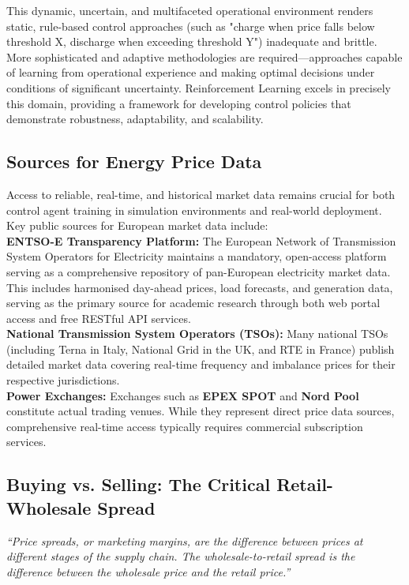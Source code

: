 \noindent
This dynamic, uncertain, and multifaceted operational environment renders static, rule-based control approaches (such as "charge when price falls below threshold X, discharge when exceeding threshold Y") inadequate and brittle. More sophisticated and adaptive methodologies are required—approaches capable of learning from operational experience and making optimal decisions under conditions of significant uncertainty. Reinforcement Learning excels in precisely this domain, providing a framework for developing control policies that demonstrate robustness, adaptability, and scalability.




\subsection{Sources for Energy Price Data}

Access to reliable, real-time, and historical market data remains crucial for both control agent training in simulation environments and real-world deployment. Key public sources for European market data include:
\\
\noindent
 \textbf{ENTSO-E Transparency Platform:} The European Network of Transmission System Operators for Electricity maintains a mandatory, open-access platform serving as a comprehensive repository of pan-European electricity market data. This includes harmonised day-ahead prices, load forecasts, and generation data, serving as the primary source for academic research through both web portal access and free RESTful API services.
    \\
\noindent
    \textbf{National Transmission System Operators (TSOs):} Many national TSOs (including Terna in Italy, National Grid in the UK, and RTE in France) publish detailed market data covering real-time frequency and imbalance prices for their respective jurisdictions.
    \\
\noindent
     \textbf{Power Exchanges:} Exchanges such as \textbf{EPEX SPOT} and \textbf{Nord Pool} constitute actual trading venues. While they represent direct price data sources, comprehensive real-time access typically requires commercial subscription services.


\subsection{Buying vs. Selling: The Critical Retail-Wholesale Spread}
\begin{center}
  \begin{minipage}{0.85\textwidth}
    \begin{displayquote}
      \large\itshape
      ``Price spreads, or marketing margins, are the difference between prices at different stages of the supply chain. 
      The wholesale-to-retail spread is the difference between the wholesale price and the retail price.''
    \end{displayquote}
  \end{minipage}
\end{center}

